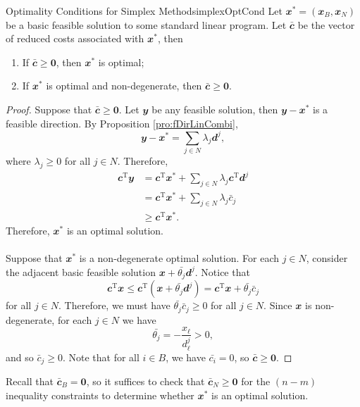 \documentclass[math, code]{amznotes}
\theoremstyle{remark}
\begin{document}
\begin{thmbox}{Optimality Conditions for Simplex Method}{simplexOptCond}
    Let $\mathbfit{x}^* = \left(\mathbfit{x}_B, \mathbfit{x}_N\right)$ be a basic feasible solution to some standard linear program. Let $\mathbfit{\bar{c}}$ be the vector of reduced costs associated with $\mathbfit{x}^*$, then 
    \begin{enumerate}
        \item If $\mathbfit{\bar{c}} \geq \mathbf{0}$, then $\mathbfit{x}^*$ is optimal;
        \item If $\mathbfit{x}^*$ is optimal and non-degenerate, then $\mathbfit{\bar{c}} \geq \mathbf{0}$.
    \end{enumerate}
    \tcblower
    \begin{proof}
        Suppose that $\mathbfit{\bar{c}} \geq \mathbf{0}$. Let $\mathbfit{y}$ be any feasible solution, then $\mathbfit{y - x}^*$ is a feasible direction. By Proposition \ref{pro:fDirLinCombi}, 
        \begin{equation*}
            \mathbfit{y - x}^* = \sum_{j \in N}\lambda_j\mathbfit{d}^j,
        \end{equation*}
        where $\lambda_j \geq 0$ for all $j \in N$. Therefore,
        \begin{align*}
            \mathbfit{c}^{\mathrm{T}}\mathbfit{y} & = \mathbfit{c}^{\mathrm{T}}\mathbfit{x}^* + \sum_{j \in N}\lambda_j\mathbfit{c}^{\mathrm{T}}\mathbfit{d}^j \\
            & = \mathbfit{c}^{\mathrm{T}}\mathbfit{x}^* + \sum_{j \in N}\lambda_j\bar{c}_j \\
            & \geq \mathbfit{c}^{\mathrm{T}}\mathbfit{x}^*.
        \end{align*}
        Therefore, $\mathbfit{x}^*$ is an optimal solution.
        \\\\
        Suppose that $\mathbfit{x}^*$ is a non-degenerate optimal solution. For each $j \in N$, consider the adjacent basic feasible solution $\mathbfit{x} + \bar{\theta_j}\mathbfit{d}^j$. Notice that 
        \begin{equation*}
            \mathbfit{c}^{\mathrm{T}}\mathbfit{x} \leq \mathbfit{c}^{\mathrm{T}}\left(\mathbfit{x} + \bar{\theta_j}\mathbfit{d}^j\right) = \mathbfit{c}^{\mathrm{T}}\mathbfit{x} + \bar{\theta_j}\bar{c}_j
        \end{equation*}
        for all $j \in N$. Therefore, we must have $\bar{\theta_j}\bar{c}_j \geq 0$ for all $j \in N$. Since $\mathbfit{x}$ is non-degenerate, for each $j \in N$ we have 
        \begin{equation*}
            \bar{\theta_j} = -\frac{x_{\ell}}{d^j_{\ell}} > 0,
        \end{equation*}
        and so $\bar{c}_j \geq 0$. Note that for all $i \in B$, we have $\bar{c_i} = 0$, so $\mathbfit{\bar{c}} \geq \mathbf{0}$.
    \end{proof}
\end{thmbox}
Recall that $\mathbfit{\bar{c}}_B = \mathbf{0}$, so it suffices to check that $\mathbfit{\bar{c}}_N \geq \mathbf{0}$ for the $(n - m)$ inequality constraints to determine whether $\mathbfit{x}^*$ is an optimal solution.
\end{document}
